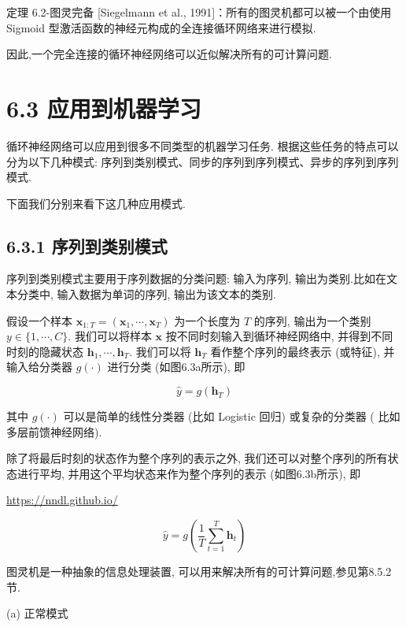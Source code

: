 \documentclass[10pt]{article}
\begin{document}
定理 6.2-图灵完备 [Siegelmann et al., 1991]：所有的图灵机都可以被一个由使用 Sigmoid 型激活函数的神经元构成的全连接循环网络来进行模拟.

因此,一个完全连接的循环神经网络可以近似解决所有的可计算问题.

\section*{6.3 应用到机器学习}
循环神经网络可以应用到很多不同类型的机器学习任务. 根据这些任务的特点可以分为以下几种模式: 序列到类别模式、同步的序列到序列模式、异步的序列到序列模式.

下面我们分别来看下这几种应用模式.

\subsection*{6.3.1 序列到类别模式}
序列到类别模式主要用于序列数据的分类问题: 输入为序列, 输出为类别.比如在文本分类中, 输入数据为单词的序列, 输出为该文本的类别.

假设一个样本 $\boldsymbol{x}_{1: T}=\left(\boldsymbol{x}_{1}, \cdots, \boldsymbol{x}_{T}\right)$ 为一个长度为 $T$ 的序列, 输出为一个类别 $y \in\{1, \cdots, C\}$. 我们可以将样本 $\boldsymbol{x}$ 按不同时刻输入到循环神经网络中, 并得到不同时刻的隐藏状态 $\boldsymbol{h}_{1}, \cdots, \boldsymbol{h}_{T}$. 我们可以将 $\boldsymbol{h}_{T}$ 看作整个序列的最终表示 (或特征), 并输入给分类器 $g(\cdot)$ 进行分类 (如图6.3a所示), 即


\begin{equation*}
\hat{y}=g\left(\boldsymbol{h}_{T}\right) \tag{6.22}
\end{equation*}


其中 $g(\cdot)$ 可以是简单的线性分类器 (比如 Logistic 回归) 或复杂的分类器 ( 比如多层前馈神经网络).

除了将最后时刻的状态作为整个序列的表示之外, 我们还可以对整个序列的所有状态进行平均, 并用这个平均状态来作为整个序列的表示 (如图6.3b所示), 即

\href{https://nndl.github.io/}{https://nndl.github.io/}


\begin{equation*}
\hat{y}=g\left(\frac{1}{T} \sum_{t=1}^{T} \boldsymbol{h}_{t}\right) \tag{6.23}
\end{equation*}


图灵机是一种抽象的信息处理装置, 可以用来解决所有的可计算问题,参见第8.5.2节.



(a) 正常模式
\end{document}
